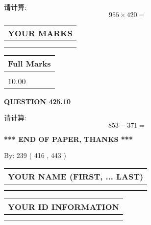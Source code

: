 \documentclass{ctexart}
\begin{document}
  
 
请计算:
\begin{equation}
955  \times    %
420 = \nonumber
\end{equation}
 

 

 
  
\vspace{0.2in}
  
\noindent\begin{tabular}{|l|}
\hline
 YOUR MARKS  \\
\hline
 \\ 
 \\ 
\hline
\end{tabular}
\hspace{0.05in} \begin{tabular}{|l|}
\hline
 Full Marks  \\
\hline
 \\ 
10.00 \\
\hline
\end{tabular}
{\textbf{\Large{QUESTION
425.10 
}}}
  
  
 
请计算:
\begin{equation}
853 -   %
371 = \nonumber
\end{equation}
 

 

 
   
   
 \vspace{0.2in}
 
   
   
   
   
\vspace{1.0in} 
{\textbf{\large{ *** END OF PAPER, THANKS *** }}} 
   
   
\hspace{1.0in} By: 
 239 ( 416 ,  443 )
   
   
   
   
\newpage 
\setcounter{page}{ 
   426001 } 
   
   
   
   
\noindent\begin{tabular}{|l|}
\hline
YOUR NAME (FIRST, ... LAST)  \\
\hline
 \\ 
 \\ 
\hline
\end{tabular}
\hspace{0.05in} \begin{tabular}{|l|}
\hline
 YOUR   ID   INFORMATION  \\
\hline
 \\ 
 \\ 
\hline
\end{tabular}
   
\end{document}
